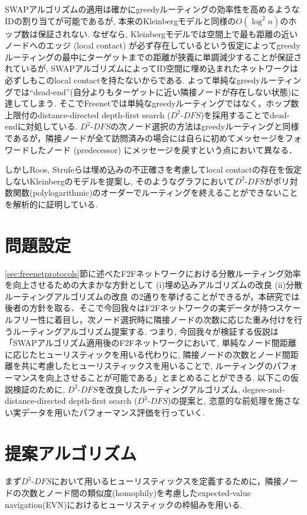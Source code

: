 \documentclass[technicalreport]{./ieicej-v3.0/UTF/ieicej}
\begin{document}
   SWAPアルゴリズムの適用は確かにgreedyルーティングの効率性を高めるようなIDの割り当てが可能であるが, 本来のKleinbergモデルと同様の$O(\log^2n)$のホップ数は保証されない. なぜなら, Kleinbergモデルでは空間上で最も距離の近いノードへのエッジ (local contact) が必ず存在しているという仮定によってgreedyルーティングの最中にターゲットまでの距離が狭義に単調減少することが保証されているが, SWAPアルゴリズムによってID空間に埋め込まれたネットワークは必ずしもこのlocal contactを持たないからである. よって単純なgreedyルーティングでは``dead-end''(自分よりもターゲットに近い隣接ノードが存在しない状態)に達してしまう. そこでFreenetでは単純なgreedyルーティングではなく，ホップ数上限付のdistance-directed depth-first search ($D^2$-$DFS$)を採用することでdead-endに対処している. $D^2$-$DFS$の次ノード選択の方法はgreedyルーティングと同様であるが，隣接ノードが全て訪問済みの場合には自らに初めてメッセージをフォワードしたノード (predecessor) にメッセージを戻すという点において異なる．

   しかしRoos, Strufeらは埋め込みの不正確さを考慮してlocal contactの存在を仮定しないKleinbergのモデルを提案し, そのようなグラフにおいて$D^2$-$DFS$がポリ対数関数(polylogarithmic)のオーダーでルーティングを終えることができないことを解析的に証明している\cite{roos2016dealing}. 

\section{問題設定}
\ref{sec:freenetprotocols}節に述べたF2Fネットワークにおける分散ルーティング効率を向上させるための大まかな方針として (i)埋め込みアルゴリズムの改良 (ii)分散ルーティングアルゴリズムの改良 の2通りを挙げることができるが，本研究では後者の方針を取る．そこで今回我々はF2Fネットワークの実データが持つスケールフリー性に着目し，次ノード選択時に隣接ノードの次数に応じた重み付けを行うルーティングアルゴリズム提案する. つまり, 今回我々が検証する仮説は「SWAPアルゴリズム適用後のF2Fネットワークにおいて, 単純なノード間距離に応じたヒューリスティックを用いる代わりに, 隣接ノードの次数とノード間距離を共に考慮したヒューリスティックスを用いることで, ルーティングのパフォーマンスを向上させることが可能である」とまとめることができる. 以下この仮説検証のために, $D^2$-$DFS$を改良したルーティングアルゴリズム, degree-and-distance-directed depth-first search ($D^3$-$DFS$)の提案と, 恣意的な前処理を施さない実データを用いたパフォーマンス評価を行っていく.

\section{提案アルゴリズム}
まず$D^3$-$DFS$において用いるヒューリスティックスを定義するために，隣接ノードの次数とノード間の類似度(homophily)を考慮したexpected-value navigation(EVN)\cite{simsek2008navigating}におけるヒューリスティックの枠組みを用いる.
\end{document}
